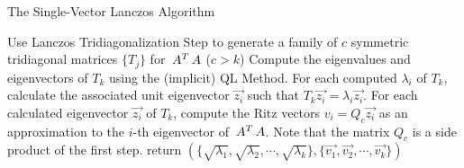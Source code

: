 \begin{frame}[plain]
	\begin{block}{}
\begin{algorithm}[H]
  \label{alg:lasvd}
  \caption{The Single-Vector Lanczos Algorithm}
%
  \DontPrintSemicolon
%
%
%
    \BlankLine
    Use Lanczos Tridiagonalization Step to generate a family of
    $c$ symmetric tridiagonal matrices $\{ T_j \}$ for $\,{A}^{T}\,A$
    ($c > k$) \;
    \BlankLine
%
    Compute the eigenvalues and eigenvectors of $T_k$ using the
    (implicit) QL Method. \;
    \BlankLine
%   
    For each computed $\lambda_i$ of $T_k$, calculate the associated
    unit eigenvector $\vec{z_i}$ such that $T_k\vec{z_i} =
    \lambda_i\vec{z_i}$. \; 
    \BlankLine
% 
    For each calculated eigenvector $\vec{z_i}$ of $T_k$, compute the Ritz
    vectors $v_i = Q_c\vec{z_i}$ as an approximation to the
    $i$-th eigenvector of $\,{A}^{T}\,A$. Note that the matrix $Q_c$ is
    a side product of the first step. \; 
    \BlankLine
%
    return $(\{\sqrt{\lambda_1},\sqrt{\lambda_2},\cdots,
    \sqrt{\lambda_k}\},
            \{\vec{v_1},\vec{v_2},\cdots,\vec{v_k}\})$
%
\end{algorithm}
	\end{block} 
\end{frame}
